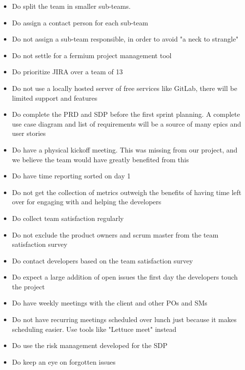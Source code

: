 \documentclass{article}
\begin{document}
\begin{itemize}
    \item Do split the team in smaller sub-teams.
    \item Do assign a contact person for each sub-team
    \item Do not assign a sub-team responsible, in order to avoid "a neck to strangle"
    \item Do not settle for a fermium project management tool
    \item Do prioritize JIRA over a team of 13
    \item Do not use a locally hosted server of free services like GitLab, there will be limited support and features
    \item Do complete the PRD and SDP before the first sprint planning. A complete use case diagram and list of requirements will be a source of many epics and user stories
    \item Do have a physical kickoff meeting. This was missing from our project, and we believe the team would have greatly benefited from this
    \item Do have time reporting sorted on day 1
    \item Do not get the collection of metrics outweigh the benefits of having time left over for engaging with and helping the developers
    \item Do collect team satisfaction regularly
    \item Do not exclude the product owners and scrum master from the team satisfaction survey
    \item Do contact developers based on the team satisfaction survey
    \item Do expect a large addition of open issues the first day the developers touch the project
    \item Do have weekly meetings with the client and other POs and SMs
    \item Do not have recurring meetings scheduled over lunch just because it makes scheduling easier. Use tools like "Lettuce meet" instead
    \item Do use the risk management developed for the SDP
    \item Do keep an eye on forgotten issues
\end{itemize}
\end{document}

